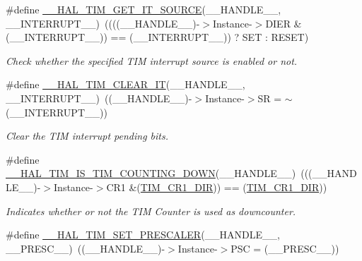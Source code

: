 \begin{DoxyCompactItemize}
\#define \hyperlink{group___t_i_m___exported___macros_ga644babf93470a6eee6bce8906c4da5c5}{\+\_\+\+\_\+\+H\+A\+L\+\_\+\+T\+I\+M\+\_\+\+G\+E\+T\+\_\+\+I\+T\+\_\+\+S\+O\+U\+R\+CE}(\+\_\+\+\_\+\+H\+A\+N\+D\+L\+E\+\_\+\+\_\+,  \+\_\+\+\_\+\+I\+N\+T\+E\+R\+R\+U\+P\+T\+\_\+\+\_\+)~((((\+\_\+\+\_\+\+H\+A\+N\+D\+L\+E\+\_\+\+\_\+)-\/$>$Instance-\/$>$D\+I\+ER \& (\+\_\+\+\_\+\+I\+N\+T\+E\+R\+R\+U\+P\+T\+\_\+\+\_\+)) == (\+\_\+\+\_\+\+I\+N\+T\+E\+R\+R\+U\+P\+T\+\_\+\+\_\+)) ? S\+ET \+: R\+E\+S\+ET)
\begin{DoxyCompactList}\small\item\em Check whether the specified T\+IM interrupt source is enabled or not. \end{DoxyCompactList}\item 
\#define \hyperlink{group___t_i_m___exported___macros_gaea68155ce77e591e0c2582def061d6f0}{\+\_\+\+\_\+\+H\+A\+L\+\_\+\+T\+I\+M\+\_\+\+C\+L\+E\+A\+R\+\_\+\+IT}(\+\_\+\+\_\+\+H\+A\+N\+D\+L\+E\+\_\+\+\_\+,  \+\_\+\+\_\+\+I\+N\+T\+E\+R\+R\+U\+P\+T\+\_\+\+\_\+)~((\+\_\+\+\_\+\+H\+A\+N\+D\+L\+E\+\_\+\+\_\+)-\/$>$Instance-\/$>$SR = $\sim$(\+\_\+\+\_\+\+I\+N\+T\+E\+R\+R\+U\+P\+T\+\_\+\+\_\+))
\begin{DoxyCompactList}\small\item\em Clear the T\+IM interrupt pending bits. \end{DoxyCompactList}\item 
\#define \hyperlink{group___t_i_m___exported___macros_gac73f5e7669d92971830481e7298e98ba}{\+\_\+\+\_\+\+H\+A\+L\+\_\+\+T\+I\+M\+\_\+\+I\+S\+\_\+\+T\+I\+M\+\_\+\+C\+O\+U\+N\+T\+I\+N\+G\+\_\+\+D\+O\+WN}(\+\_\+\+\_\+\+H\+A\+N\+D\+L\+E\+\_\+\+\_\+)~(((\+\_\+\+\_\+\+H\+A\+N\+D\+L\+E\+\_\+\+\_\+)-\/$>$Instance-\/$>$C\+R1 \&(\hyperlink{group___peripheral___registers___bits___definition_gacea10770904af189f3aaeb97b45722aa}{T\+I\+M\+\_\+\+C\+R1\+\_\+\+D\+IR})) == (\hyperlink{group___peripheral___registers___bits___definition_gacea10770904af189f3aaeb97b45722aa}{T\+I\+M\+\_\+\+C\+R1\+\_\+\+D\+IR}))
\begin{DoxyCompactList}\small\item\em Indicates whether or not the T\+IM Counter is used as downcounter. \end{DoxyCompactList}\item 
\#define \hyperlink{group___t_i_m___exported___macros_gafdc5a06eab07e0c24e729fd492bdb27c}{\+\_\+\+\_\+\+H\+A\+L\+\_\+\+T\+I\+M\+\_\+\+S\+E\+T\+\_\+\+P\+R\+E\+S\+C\+A\+L\+ER}(\+\_\+\+\_\+\+H\+A\+N\+D\+L\+E\+\_\+\+\_\+,  \+\_\+\+\_\+\+P\+R\+E\+S\+C\+\_\+\+\_\+)~((\+\_\+\+\_\+\+H\+A\+N\+D\+L\+E\+\_\+\+\_\+)-\/$>$Instance-\/$>$P\+SC = (\+\_\+\+\_\+\+P\+R\+E\+S\+C\+\_\+\+\_\+))

\end{DoxyCompactItemize}
